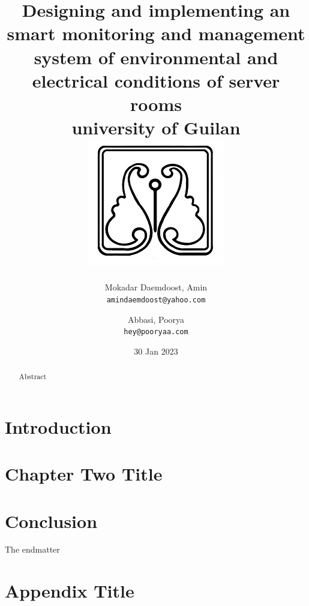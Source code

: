 \documentclass[12pt]{report}
\title{
{Designing and implementing an smart monitoring and management system of environmental and electrical conditions of server rooms
    }\\
{\large university of Guilan}\\
{\includegraphics{logo.jpg}}
}
\author{
  Mokadar Daemdoost, Amin\\
  \texttt{amindaemdoost@yahoo.com}
  \and
  Abbasi, Poorya\\
  \texttt{hey@pooryaa.com}
}
\date{30 Jan 2023}
\begin{document}
    \maketitle
    \begin{abstract}
        Abstract
    \end{abstract}
    \tableofcontents

    \chapter{Introduction}
    

    \chapter{Chapter Two Title}
    


    \chapter{Conclusion}
    
    The endmatter

    \appendix
    \chapter{Appendix Title}
    
\end{document}
